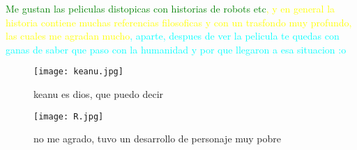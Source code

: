 \documentclass[A5paper 11pt]{article}
\begin{document}
\textcolor{green}{Me gustan las peliculas distopicas con historias de robots etc}\textcolor{yellow}{, y en general la historia contiene muchas referencias filosoficas y con un trasfondo muy profundo, las cuales me agradan mucho}\textcolor{cyan}{, aparte, despues de ver la pelicula te quedas con ganas de saber que paso con la humanidad y por que llegaron a esa situacion :o} \\
\newpage
\begin{figure}
    \centering
    \texttt{[image: keanu.jpg]}
    \caption{keanu es dios, que puedo decir}
\end{figure}

\begin{figure}
    \centering
    \texttt{[image: R.jpg]}
    \caption{no me agrado, tuvo un desarrollo de personaje muy pobre}
\end{figure}
\end{document}
